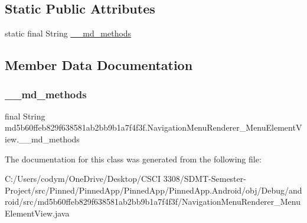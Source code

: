 \subsection*{Static Public Attributes}
\begin{DoxyCompactItemize}
\item 
static final String \hyperlink{classmd5b60ffeb829f638581ab2bb9b1a7f4f3f_1_1_navigation_menu_renderer___menu_element_view_a04d38a07cbc75040c62aaa944c9b4174}{\+\_\+\+\_\+md\+\_\+methods}
\end{DoxyCompactItemize}


\subsection{Member Data Documentation}
\mbox{\label{classmd5b60ffeb829f638581ab2bb9b1a7f4f3f_1_1_navigation_menu_renderer___menu_element_view_a04d38a07cbc75040c62aaa944c9b4174}} 
\subsubsection{\texorpdfstring{\+\_\+\+\_\+md\+\_\+methods}{\_\_md\_methods}}
{\footnotesize\ttfamily final String md5b60ffeb829f638581ab2bb9b1a7f4f3f.\+Navigation\+Menu\+Renderer\+\_\+\+Menu\+Element\+View.\+\_\+\+\_\+md\+\_\+methods\hspace{0.3cm}{\ttfamily [static]}}



The documentation for this class was generated from the following file\+:\begin{DoxyCompactItemize}
\item 
C\+:/\+Users/codym/\+One\+Drive/\+Desktop/\+C\+S\+C\+I 3308/\+S\+D\+M\+T-\/\+Semester-\/\+Project/src/\+Pinned/\+Pinned\+App/\+Pinned\+App/\+Pinned\+App.\+Android/obj/\+Debug/android/src/md5b60ffeb829f638581ab2bb9b1a7f4f3f/Navigation\+Menu\+Renderer\+\_\+\+Menu\+Element\+View.\+java\end{DoxyCompactItemize}

